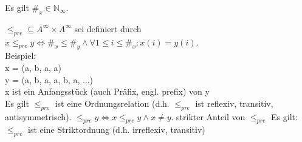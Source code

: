 Es gilt $\#_x \in \mathbb{N}_\infty$.

$\leq_{pre} \subseteq A^\infty \times A^\infty$ sei definiert durch $x \leq_{pre} y \Leftrightarrow \#_x \leq \#_y \land \forall 1 \leq i \leq \#_x: x(i) = y(i)$.\\
Beispiel: \\
x = (a, b, a, a)\\
y = (a, b, a, a, b, a, ...)\\
x ist ein Anfangsstück (auch Präfix, engl. prefix) von y\\
Es gilt $\leq_{pre}$ ist eine Ordnungsrelation (d.h. $\leq_{pre}$ ist reflexiv, transitiv, antisymmetrisch).
$\le_{pre} y \Leftrightarrow x \leq_{pre} y \land x \neq y$. strikter Anteil von $\leq_{pre}$
Es gilt: $\le_{pre}$ ist eine Striktordnung (d.h. irreflexiv, transitiv)
\\

